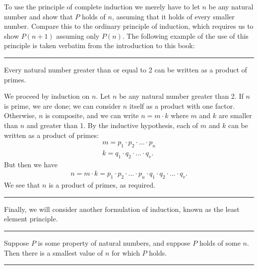\documentclass[letterpaper,10pt,english]{sphinxmanual}
\begin{document}
\sphinxAtStartPar
To use the principle of complete induction we merely have to let \(n\) be any natural number and show that \(P\) holds of \(n\), assuming that it holds of every smaller number. Compare this to the ordinary principle of induction, which requires us to show \(P (n + 1)\) assuming only \(P(n)\). The following example of the use of this principle is taken verbatim from the introduction to this book:


\bigskip\hrule\bigskip


\sphinxAtStartPar
{} Every natural number greater than or equal to 2 can be written as a product of primes.

\sphinxAtStartPar
{} We proceed by induction on \(n\). Let \(n\) be any natural number greater than 2. If \(n\) is prime, we are done; we can consider \(n\) itself as a product with one factor. Otherwise, \(n\) is composite, and we can write \(n = m \cdot k\) where \(m\) and \(k\) are smaller than \(n\) and greater than 1. By the inductive hypothesis, each of \(m\) and \(k\) can be written as a product of primes:
\begin{equation*}
\begin{split}m = p_1 \cdot p_2 \cdot \ldots \cdot p_u \\
k = q_1 \cdot q_2 \cdot \ldots \cdot q_v.\end{split}
\end{equation*}
\sphinxAtStartPar
But then we have
\begin{equation*}
\begin{split}n = m \cdot k = p_1 \cdot p_2 \cdot \ldots \cdot p_u \cdot q_1 \cdot
q_2 \cdot \ldots \cdot q_v.\end{split}
\end{equation*}
\sphinxAtStartPar
We see that \(n\) is a product of primes, as required.


\bigskip\hrule\bigskip


\sphinxAtStartPar
Finally, we will consider another formulation of induction, known as the least element principle.


\bigskip\hrule\bigskip


\sphinxAtStartPar
{} Suppose \(P\) is some property of natural numbers, and suppose \(P\) holds of some \(n\). Then there is a smallest value of \(n\) for which \(P\) holds.


\bigskip\hrule\bigskip
\end{document}
